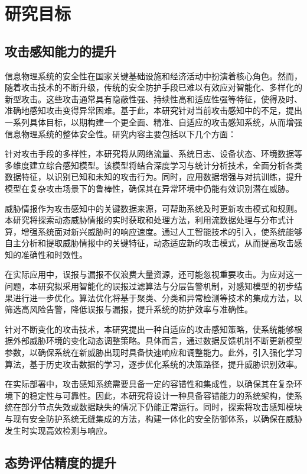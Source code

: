 \section{研究目标}

\subsection{攻击感知能力的提升}

信息物理系统的安全性在国家关键基础设施和经济活动中扮演着核心角色。然而，随着攻击技术的不断升级，传统的安全防护手段已难以有效应对智能化、多样化的新型攻击。这些攻击通常具有隐蔽性强、持续性高和适应性强等特征，使得及时、准确地感知攻击变得异常困难。基于此，本研究针对当前攻击感知中的不足，提出一系列具体目标，以期构建一个更全面、精准、自适应的攻击感知系统，从而增强信息物理系统的整体安全性。研究内容主要包括以下几个方面：

针对攻击手段的多样性，本研究将从网络流量、系统日志、设备状态、环境数据等多维度建立综合感知模型。该模型将结合深度学习与统计分析技术，全面分析各类数据特征，以识别已知和未知的攻击行为。同时，应用数据增强与对抗训练，提升模型在复杂攻击场景下的鲁棒性，确保其在异常环境中仍能有效识别潜在威胁。

威胁情报作为攻击感知中的关键数据来源，可帮助系统及时更新攻击模式和规则。本研究将探索动态威胁情报的实时获取和处理方法，利用流数据处理与分布式计算，增强系统面对新兴威胁时的响应速度。通过人工智能技术的引入，使系统能够自主分析和提取威胁情报中的关键特征，动态适应新的攻击模式，从而提高攻击感知的准确性和时效性。

在实际应用中，误报与漏报不仅浪费大量资源，还可能忽视重要攻击。为应对这一问题，本研究拟采用智能化的误报过滤算法与分层告警机制，对感知模型的初步结果进行进一步优化。算法优化将基于聚类、分类和异常检测等技术的集成方法，以筛选高风险告警，降低误报与漏报，提升系统的防护效率与准确性。

针对不断变化的攻击技术，本研究提出一种自适应的攻击感知策略，使系统能够根据外部威胁环境的变化动态调整策略。具体而言，通过数据反馈机制不断更新模型参数，以确保系统在新威胁出现时具备快速响应和调整能力。此外，引入强化学习算法，基于历史攻击数据的学习，逐步优化系统的决策路径，提升威胁识别效率。

在实际部署中，攻击感知系统需要具备一定的容错性和集成性，以确保其在复杂环境下的稳定性与可靠性。因此，本研究将设计一种具备容错能力的系统架构，使系统在部分节点失效或数据缺失的情况下仍能正常运行。同时，探索将攻击感知模块与现有安全防护系统无缝集成的方法，构建一体化的安全防御体系，以确保在威胁发生时实现高效检测与响应。

\subsection{态势评估精度的提升}

